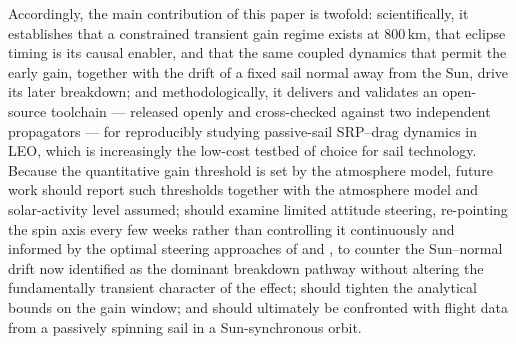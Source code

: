 \vspace{5pt}
\par\noindent Accordingly, the main contribution of this paper is twofold: scientifically, it establishes that a constrained transient gain regime exists at \(800\,\mathrm{km}\), that eclipse timing is its causal enabler, and that the same coupled dynamics that permit the early gain, together with the drift of a fixed sail normal away from the Sun, drive its later breakdown; and methodologically, it delivers and validates an open-source toolchain --- released openly \citep{svarogPropagatorCode2026} and cross-checked against two independent propagators --- for reproducibly studying passive-sail SRP--drag dynamics in LEO, which is increasingly the low-cost testbed of choice for sail technology. Because the quantitative gain threshold is set by the atmosphere model, future work should report such thresholds together with the atmosphere model and solar-activity level assumed; should examine limited attitude steering, re-pointing the spin axis every few weeks rather than controlling it continuously and informed by the optimal steering approaches of \citet{dachwaldOptimalSolarSail2005} and \citet{mcinnes1999}, to counter the Sun--normal drift now identified as the dominant breakdown pathway without altering the fundamentally transient character of the effect; should tighten the analytical bounds on the gain window; and should ultimately be confronted with flight data from a passively spinning sail in a Sun-synchronous orbit.
\FloatBarrier
